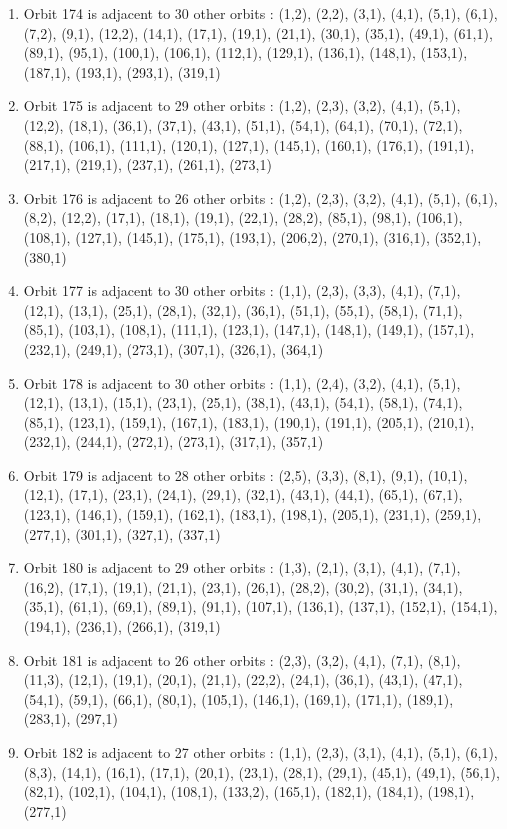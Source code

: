 \documentclass[12pt]{article}
\begin{document}
\begin{enumerate}
\item Orbit 174 is adjacent to 30 other orbits : (1,2), (2,2), (3,1), (4,1), (5,1), (6,1), (7,2), (9,1), (12,2), (14,1), (17,1), (19,1), (21,1), (30,1), (35,1), (49,1), (61,1), (89,1), (95,1), (100,1), (106,1), (112,1), (129,1), (136,1), (148,1), (153,1), (187,1), (193,1), (293,1), (319,1)
\item Orbit 175 is adjacent to 29 other orbits : (1,2), (2,3), (3,2), (4,1), (5,1), (12,2), (18,1), (36,1), (37,1), (43,1), (51,1), (54,1), (64,1), (70,1), (72,1), (88,1), (106,1), (111,1), (120,1), (127,1), (145,1), (160,1), (176,1), (191,1), (217,1), (219,1), (237,1), (261,1), (273,1)
\item Orbit 176 is adjacent to 26 other orbits : (1,2), (2,3), (3,2), (4,1), (5,1), (6,1), (8,2), (12,2), (17,1), (18,1), (19,1), (22,1), (28,2), (85,1), (98,1), (106,1), (108,1), (127,1), (145,1), (175,1), (193,1), (206,2), (270,1), (316,1), (352,1), (380,1)
\item Orbit 177 is adjacent to 30 other orbits : (1,1), (2,3), (3,3), (4,1), (7,1), (12,1), (13,1), (25,1), (28,1), (32,1), (36,1), (51,1), (55,1), (58,1), (71,1), (85,1), (103,1), (108,1), (111,1), (123,1), (147,1), (148,1), (149,1), (157,1), (232,1), (249,1), (273,1), (307,1), (326,1), (364,1)
\item Orbit 178 is adjacent to 30 other orbits : (1,1), (2,4), (3,2), (4,1), (5,1), (12,1), (13,1), (15,1), (23,1), (25,1), (38,1), (43,1), (54,1), (58,1), (74,1), (85,1), (123,1), (159,1), (167,1), (183,1), (190,1), (191,1), (205,1), (210,1), (232,1), (244,1), (272,1), (273,1), (317,1), (357,1)
\item Orbit 179 is adjacent to 28 other orbits : (2,5), (3,3), (8,1), (9,1), (10,1), (12,1), (17,1), (23,1), (24,1), (29,1), (32,1), (43,1), (44,1), (65,1), (67,1), (123,1), (146,1), (159,1), (162,1), (183,1), (198,1), (205,1), (231,1), (259,1), (277,1), (301,1), (327,1), (337,1)
\item Orbit 180 is adjacent to 29 other orbits : (1,3), (2,1), (3,1), (4,1), (7,1), (16,2), (17,1), (19,1), (21,1), (23,1), (26,1), (28,2), (30,2), (31,1), (34,1), (35,1), (61,1), (69,1), (89,1), (91,1), (107,1), (136,1), (137,1), (152,1), (154,1), (194,1), (236,1), (266,1), (319,1)
\item Orbit 181 is adjacent to 26 other orbits : (2,3), (3,2), (4,1), (7,1), (8,1), (11,3), (12,1), (19,1), (20,1), (21,1), (22,2), (24,1), (36,1), (43,1), (47,1), (54,1), (59,1), (66,1), (80,1), (105,1), (146,1), (169,1), (171,1), (189,1), (283,1), (297,1)
\item Orbit 182 is adjacent to 27 other orbits : (1,1), (2,3), (3,1), (4,1), (5,1), (6,1), (8,3), (14,1), (16,1), (17,1), (20,1), (23,1), (28,1), (29,1), (45,1), (49,1), (56,1), (82,1), (102,1), (104,1), (108,1), (133,2), (165,1), (182,1), (184,1), (198,1), (277,1)

\end{enumerate}
\end{document}
